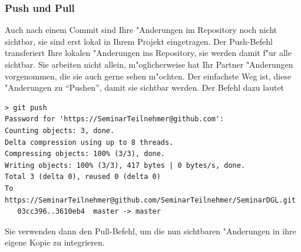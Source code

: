 \documentclass[a4paper,12pt]{article}
\begin{document}
\subsubsection{Push und Pull}
Auch nach einem Commit sind Ihre "Anderungen im Repository noch nicht
sichtbar, sie sind erst lokal in Ihrem Projekt eingetragen.
Der Push-Befehl transferiert Ihre lokalen "Anderungen ins Repository,
sie werden damit f"ur alle sichtbar.
Sie arbeiten nicht allein, m"oglicherweise hat Ihr Partner "Anderungen
vorgenommen, die sie auch gerne sehen m"ochten.
Der einfachste Weg ist, diese "Anderungen zu ``Pushen'', damit sie
sichtbar werden.
Der Befehl dazu lautet
\begin{verbatim}
> git push
Password for 'https://SeminarTeilnehmer@github.com': 
Counting objects: 3, done.
Delta compression using up to 8 threads.
Compressing objects: 100% (3/3), done.
Writing objects: 100% (3/3), 417 bytes | 0 bytes/s, done.
Total 3 (delta 0), reused 0 (delta 0)
To https://SeminarTeilnehmer@github.com/SeminarTeilnehmer/SeminarDGL.git
   03cc396..3610eb4  master -> master
\end{verbatim}
Sie verwenden dann den Pull-Befehl, um die nun sichtbaren "Anderungen
in ihre eigene Kopie zu integrieren.
\end{document}
